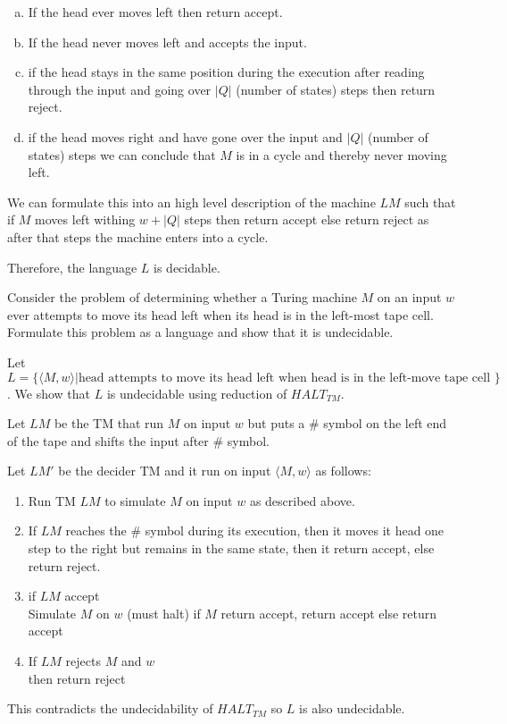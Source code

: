 \documentclass[12pt]{exam}
\begin{document}
\begin{questions}
\begin{solution}
    \begin{enumerate}[a)]
      \item If the head ever moves left then return accept.
      \item If the head never moves left and accepts the input.
      \item if the head stays in the same position during the execution after reading through the input and going over $|Q|$ (number of states) steps then return reject.
      \item if the head moves right and have gone over the input and $|Q|$ (number of states) steps we can conclude that $M$ is in a cycle and thereby never moving left.
    \end{enumerate}

    We can formulate this into an high level description of the machine $LM$ such that if $M$ moves left withing $w+|Q|$ steps then return accept else return reject as after that steps the machine enters into a cycle.

    Therefore, the language $L$ is decidable.



    
  \end{solution}

  \question{}
  Consider the problem of determining whether a Turing machine $M$ on an input $w$ ever
  attempts to move its head left when its head is in the left-most tape cell.
  Formulate this problem as a language and show that it is undecidable.


  \begin{solution}

    Let $L = \{\langle M,w\rangle| \text{head attempts to move its head left when head is in the left-move tape cell }\}$. We show that $L$ is undecidable using reduction of $HALT_{TM}$.

    Let $LM$ be the TM that run $M$ on input $w$ but puts a $\#$ symbol on the left end of the tape and shifts the input after $\#$ symbol.

    Let $LM'$ be the decider TM and it run on input $\langle M,w\rangle$ as follows:
    \begin{enumerate}[1.]
      \item Run TM $LM$ to simulate $M$ on input $w$ as described above.
      \item If $LM$ reaches the $\#$ symbol during its execution, then it moves it head one step to the right but remains in the same state, then it return accept, else return reject.
      \item if $LM$ accept\\
            Simulate $M$ on $w$ (must halt)
            if $M$ return accept, return accept else return accept
      \item If $LM$ rejects $M$ and $w$\\
            then return reject
    \end{enumerate}

    This contradicts the undecidability of $HALT_{TM}$ so $L$ is also undecidable.

  \end{solution}

\end{questions}
\end{document}
